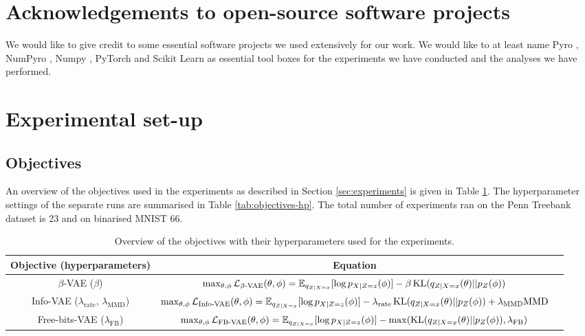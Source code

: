 \onecolumn
\section{Acknowledgements to open-source software projects}

We would like to give credit to some essential software projects we used extensively for our work. We would like to at least name Pyro \citep{bingham2019pyro}, NumPyro \citep{phan2019numpyro}, Numpy \citep{harris2020numpy}, PyTorch \citep{pytorch2019} and Scikit Learn \citep{scikit} as essential tool boxes for the experiments we have conducted and the analyses we have performed.

\section{Experimental set-up}\label{app:hyperparameters}
\subsection{Objectives}

An overview of the objectives used in the experiments as described in Section \ref{sec:experiments} is given in Table \ref{tab:objectives}. The hyperparameter settings of the separate runs are summarised in Table \ref{tab:objectives-hp}. The total number of experiments ran on the Penn Treebank dataset is 23 and on binarised MNIST 66.

\begin{table}[!htb]
    \centering
    \scriptsize
    \begin{tabular}{ccc}
        \toprule
        Objective (hyperparameters) & Equation \\
        \midrule
        $\beta$-VAE \cite{higgins2016beta} ($\beta$) & $\max_{\theta, \phi} \mathcal{L}_{\beta\text{-VAE}}(\theta, \phi) = \mathbb{E}_{q_{Z|X=x}}[\log p_{X|Z=z}(\phi)] - \beta \operatorname{KL}(q_{Z|X=x}(\theta)||p_{Z}(\phi))$ \\
        \addlinespace[0.5em]
        Info-VAE \cite{zhao2017infovae} ($\lambda_\text{rate}$, $\lambda_\text{MMD}$) & $\max_{\theta, \phi} \mathcal{L}_{\text{Info-VAE}}(\theta, \phi) = \mathbb{E}_{q_{Z|X=x}}[\log p_{X|Z=z}(\phi)] - \lambda_\text{rate} \operatorname{KL}(q_{Z|X=x}(\theta)||p_{Z}(\phi)) + \lambda_\text{MMD} \text{MMD}$\\
        \addlinespace[0.5em]
        Free-bits-VAE \cite{kingma2016improved}  ($\lambda_\text{FB}$) & $\max_{\theta, \phi} \mathcal{L}_{\text{FB-VAE}}(\theta, \phi) = \mathbb{E}_{q_{Z|X=x}}[\log p_{X|Z=z}(\phi)] - \max( \operatorname{KL}(q_{Z|X=x}(\theta)||p_{Z}(\phi)), \lambda_{\text{FB}})$ \\
        \bottomrule
    \end{tabular}
    \caption{Overview of the objectives with their hyperparameters used for the experiments.}
    \label{tab:objectives}
\end{table}

